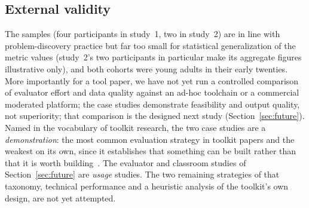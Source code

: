 \documentclass[conference]{IEEEtran}
\begin{document}
\subsection*{External validity}
The samples (four participants in study~1, two in study~2) are in line
with problem-discovery practice
\cite{virzi1992refining,nielsen1993mathematical} but far too small for
statistical generalization of the metric values (study~2's two
participants in particular make its aggregate figures illustrative
only), and both cohorts were young adults in their early twenties. More importantly for a tool paper, we have not yet
run a controlled comparison of evaluator effort and data quality against
an ad-hoc toolchain or a commercial moderated platform; the case studies
demonstrate feasibility and output quality, not superiority; that
comparison is the designed next study (Section~\ref{sec:future}). Named in
the vocabulary of toolkit research, the two case studies are a
\emph{demonstration}: the most common evaluation strategy in toolkit papers
and the weakest on its own, since it establishes that something can be
built rather than that it is worth building~\cite{ledo2018evaluation}. The
evaluator and classroom studies of Section~\ref{sec:future} are
\emph{usage} studies. The two remaining strategies of that taxonomy,
technical performance and a heuristic analysis of the toolkit's own design,
are not yet attempted.
\end{document}
